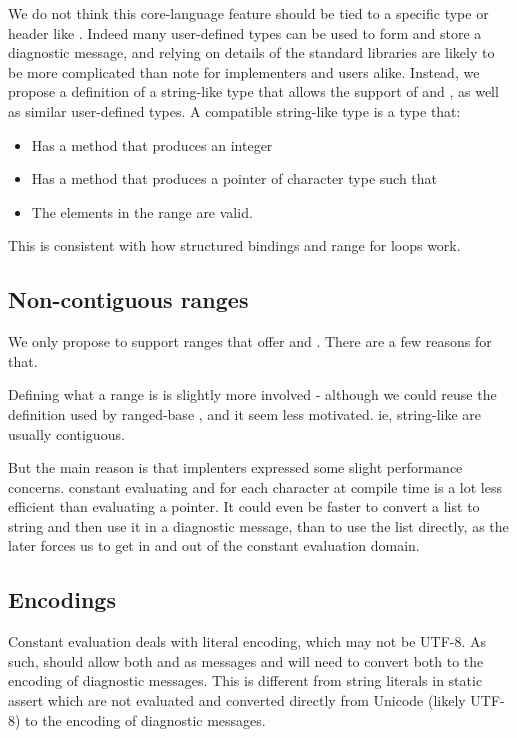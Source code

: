 \documentclass{wg21}
\begin{document}
We do not think this core-language feature should be tied to a specific type or header like .
Indeed many user-defined types can be used to form and store a diagnostic message, and relying on details of the standard libraries are likely to be more complicated than note for
implementers and users alike.
Instead, we propose a definition of a string-like type that allows the support of  and , as well as similar user-defined types.
A compatible string-like type is a type that:
\begin{itemize}
 \item Has a  method that produces an integer
 \item Has a  method that produces a pointer of character type such that
 \item The elements in the range \tcode{[data(), data()+size())} are valid.
\end{itemize}

This is consistent with how structured bindings and range for loops work.

\subsection{Non-contiguous ranges}

We only propose to support ranges that offer  and .
There are a few reasons for that.

Defining what a range is is slightly more involved - although we could reuse the definition used by ranged-base , and it seem less motivated.
ie, string-like are usually contiguous.

But the main reason is that implenters expressed some slight performance concerns.
constant evaluating  and  for each character at compile time is a lot less efficient than evaluating a pointer.
It could even be faster to convert a list to string and then use it in a diagnostic message, than to use the list directly, as the later forces
us to get in and out of the constant evaluation domain.


\subsection{Encodings}

Constant evaluation deals with literal encoding, which may not be UTF-8.
As such,  should allow both  and  as messages and will need to convert both to the encoding of diagnostic messages.
This is different from string literals in static assert which are not evaluated and converted directly from Unicode (likely UTF-8) to the encoding of diagnostic messages.
\end{document}

